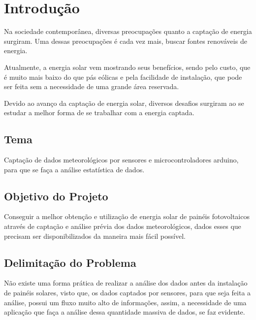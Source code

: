 \chapter{Introdução}

Na sociedade contemporânea, diversas preocupações quanto a captação de energia surgiram. Uma dessas preocupações é cada vez mais, buscar fontes renováveis de energia.

Atualmente, a energia solar vem mostrando seus benefícios, sendo pelo custo, que é muito mais baixo do que pás eólicas e pela facilidade de instalação, que pode ser feita sem a necessidade de uma grande área reservada.

Devido ao avanço da captação de energia solar, diversos desafios surgiram ao se estudar a melhor forma de se trabalhar com a energia captada.

\section{Tema}

Captação de dados meteorológicos por sensores e microcontroladores arduino, para que se faça a análise estatística de dados.

\section{Objetivo do Projeto}

Conseguir a melhor obtenção e utilização de energia solar de painéis fotovoltaicos através de captação e análise prévia dos dados meteorológicos, dados esses que precisam ser disponibilizados da maneira mais fácil possível.

\section{Delimitação do Problema}

Não existe uma forma prática de realizar a análise dos dados antes da instalação de painéis solares, visto que, os dados captados por sensores, para que seja feita a análise, possui um fluxo muito alto de informações, assim, a necessidade de uma aplicação que faça a análise dessa quantidade massiva de dados, se faz evidente.

